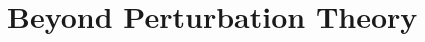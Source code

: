 \documentclass[11pt,a4paper]{article}
\makeatletter
\numberwithin{equation}{subsection}
\newcommand{\checklabel}[2]{%
  \begingroup
  \def\@currentlabel{#2}%
  \label{#1}%
  \endgroup
}
\makeatother
\begin{document}
\setcounter{section}{28}
\section{Beyond Perturbation Theory}
\setcounter{subsection}{3}

\checklabel{eq:17.5.33}{17.5.33}
\checklabel{eq:19.7.2}{19.7.2}
\checklabel{eq:22.2.24}{22.2.24}
\checklabel{eq:23.5.20}{23.5.20}
\checklabel{eq:25.2.9}{25.2.9}
\checklabel{eq:27.3.1}{27.3.1}
\checklabel{eq:29.3.31}{29.3.31}

\checklabel{ch29-ref-2}{2}
\checklabel{ch29-ref-6}{6}
\checklabel{ch29-ref-7}{7}
\checklabel{ch29-ref-8}{8}


\end{document}
